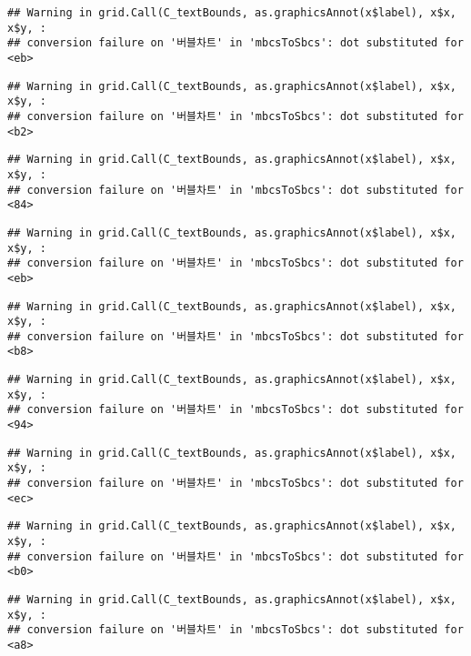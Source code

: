 \documentclass[
]{article}
\begin{document}
\begin{verbatim}
## Warning in grid.Call(C_textBounds, as.graphicsAnnot(x$label), x$x, x$y, :
## conversion failure on '버블차트' in 'mbcsToSbcs': dot substituted for <eb>
\end{verbatim}

\begin{verbatim}
## Warning in grid.Call(C_textBounds, as.graphicsAnnot(x$label), x$x, x$y, :
## conversion failure on '버블차트' in 'mbcsToSbcs': dot substituted for <b2>
\end{verbatim}

\begin{verbatim}
## Warning in grid.Call(C_textBounds, as.graphicsAnnot(x$label), x$x, x$y, :
## conversion failure on '버블차트' in 'mbcsToSbcs': dot substituted for <84>
\end{verbatim}

\begin{verbatim}
## Warning in grid.Call(C_textBounds, as.graphicsAnnot(x$label), x$x, x$y, :
## conversion failure on '버블차트' in 'mbcsToSbcs': dot substituted for <eb>
\end{verbatim}

\begin{verbatim}
## Warning in grid.Call(C_textBounds, as.graphicsAnnot(x$label), x$x, x$y, :
## conversion failure on '버블차트' in 'mbcsToSbcs': dot substituted for <b8>
\end{verbatim}

\begin{verbatim}
## Warning in grid.Call(C_textBounds, as.graphicsAnnot(x$label), x$x, x$y, :
## conversion failure on '버블차트' in 'mbcsToSbcs': dot substituted for <94>
\end{verbatim}

\begin{verbatim}
## Warning in grid.Call(C_textBounds, as.graphicsAnnot(x$label), x$x, x$y, :
## conversion failure on '버블차트' in 'mbcsToSbcs': dot substituted for <ec>
\end{verbatim}

\begin{verbatim}
## Warning in grid.Call(C_textBounds, as.graphicsAnnot(x$label), x$x, x$y, :
## conversion failure on '버블차트' in 'mbcsToSbcs': dot substituted for <b0>
\end{verbatim}

\begin{verbatim}
## Warning in grid.Call(C_textBounds, as.graphicsAnnot(x$label), x$x, x$y, :
## conversion failure on '버블차트' in 'mbcsToSbcs': dot substituted for <a8>
\end{verbatim}
\end{document}
